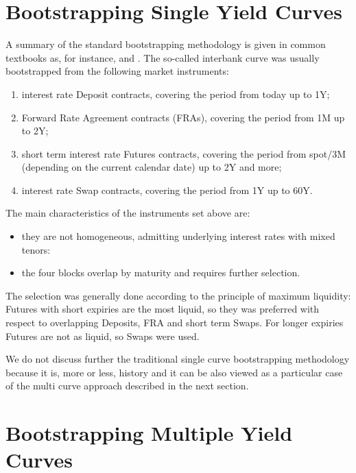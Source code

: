\documentclass[11pt,reqno]{amsart}
\begin{document}
\section{Bootstrapping Single Yield Curves}
\label{sec:SingleBootstrapping}
A summary of the standard bootstrapping methodology is given in common textbooks as, for instance, \cite{Hul08} and \cite{Reb1998}. The so-called interbank curve was usually bootstrapped from the following market instruments:
\begin{enumerate}
\item interest rate Deposit contracts, covering the period from today up to 1Y;
\item Forward Rate Agreement contracts (FRAs), covering the period from 1M up to 2Y;
\item short term interest rate Futures contracts, covering the period from spot/3M (depending on the current calendar date) up to 2Y and more;
\item interest rate Swap contracts, covering the period from 1Y up to 60Y.
\end{enumerate}
The main characteristics of the instruments set above are:
\begin{itemize}
  \item they are not homogeneous, admitting underlying interest rates with mixed tenors:
  \item the four blocks overlap by maturity and requires further selection.
\end{itemize}
The selection was generally done according to the principle of maximum liquidity: Futures with short expiries are the most liquid, so they was preferred with respect to overlapping Deposits, FRA and short term Swaps. For longer expiries Futures are not as liquid, so Swaps were used.
\par
We do not discuss further the traditional single curve bootstrapping methodology because it is, more or less, history and it can be also viewed as a particular case of the multi curve approach described in the next section.

\section{Bootstrapping Multiple Yield Curves}
\label{sec:MultiBootstrapping}
\end{document}
